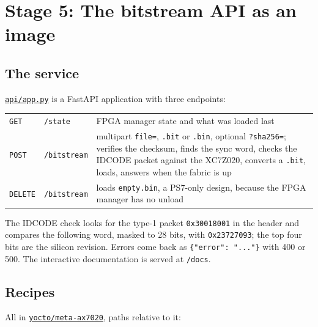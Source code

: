 \documentclass[11pt,a4paper,oneside]{article}
\newcommand{\file}[1]{{\color{bluemid}\nolinkurl{#1}}}
\newcommand{\cmd}[1]{\texttt{#1}}
\newcommand{\repo}{https://github.com/MaxClerkwell/ax7020-bringup}
\newcommand{\rfile}[1]{\href{\repo/blob/master/#1}{\color{bluemid}\nolinkurl{#1}}}
\begin{document}
\section{Stage 5: The bitstream API as an image}

\subsection{The service}

\rfile{api/app.py} is a FastAPI application with three endpoints:

\begin{center}\small
\begin{tabularx}{\textwidth}{@{}llX@{}}
\toprule
\cmd{GET} & \file{/state} & FPGA manager state and what was loaded last \\
\cmd{POST} & \file{/bitstream} & multipart \cmd{file=}, \cmd{.bit} or \cmd{.bin}, optional \cmd{?sha256=}; verifies the checksum, finds the sync word, checks the IDCODE packet against the XC7Z020, converts a \cmd{.bit}, loads, answers when the fabric is up \\
\cmd{DELETE} & \file{/bitstream} & loads \file{empty.bin}, a PS7-only design, because the FPGA manager has no unload \\
\bottomrule
\end{tabularx}
\end{center}

The IDCODE check looks for the type-1 packet \cmd{0x30018001} in the header
and compares the following word, masked to 28 bits, with \cmd{0x23727093};
the top four bits are the silicon revision. Errors come back as
\cmd{\{"error": "..."\}} with 400 or 500. The interactive documentation is
served at \file{/docs}.

\subsection{Recipes}

All in \rfile{yocto/meta-ax7020}, paths relative to it:
\end{document}
